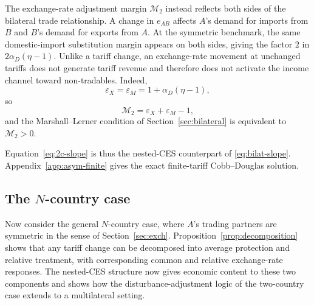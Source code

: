 \documentclass[11pt]{article}
\begin{document}
The exchange-rate adjustment margin $\mathcal M_2$ instead reflects both sides of the bilateral trade relationship. A change in $e_{AB}$ affects $A$'s demand for imports from $B$ and $B$'s demand for exports from $A$. At the symmetric benchmark, the same domestic-import substitution margin appears on both sides, giving the factor $2$ in $2\alpha_D(\eta-1)$. Unlike a tariff change, an exchange-rate movement at unchanged tariffs does not generate tariff revenue and therefore does not activate the income channel toward non-tradables. Indeed,
\begin{equation*}
\varepsilon_X=\varepsilon_M=1+\alpha_D(\eta-1),
\end{equation*}
so
\begin{equation}
\mathcal M_2=\varepsilon_X+\varepsilon_M-1,
\end{equation}
and the Marshall--Lerner condition of Section~\ref{sec:bilateral} is equivalent to $\mathcal M_2>0$.

Equation~\eqref{eq:2c-slope} is thus the nested-CES counterpart of \eqref{eq:bilat-slope}. Appendix~\ref{app:asym-finite} gives the exact finite-tariff Cobb--Douglas solution.

\subsection{The $N$-country case}
\label{sec:ncountry}

Now consider the general $N$-country case, where $A$'s trading partners are symmetric in the sense of Section~\ref{sec:exch}. Proposition~\ref{prop:decomposition} shows that any tariff change can be decomposed into average protection and relative treatment, with corresponding common and relative exchange-rate responses. The nested-CES structure now gives economic content to these two components and shows how the disturbance-adjustment logic of the two-country case extends to a multilateral setting.
\end{document}
